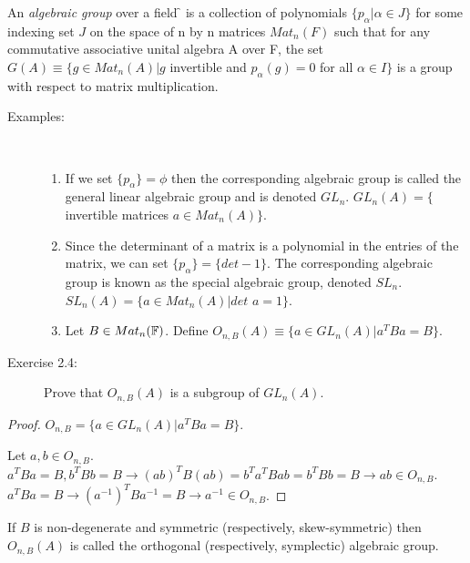 \documentclass[aps,onecolumn,secnumarabic,nobalancelastpage,amsmath,amssymb]{revtex4}
\begin{document}
An {\slshape algebraic group} over a field {\f} is a collection of polynomials $\{p_\alpha | \alpha \in J\}$ for some indexing set $J$ on the space of n by n matrices $Mat_n(F)$ such that for any commutative associative unital algebra A over F, the set $G(A) \equiv \{ g \in Mat_n(A) | g$ invertible and $p_\alpha(g) = 0$ for all $\alpha \in I \}$ is a group with respect to matrix multiplication. 

\begin{description}
\item[Examples:]\ 

\begin{enumerate}
\item If we set $\{p_\alpha\} = \phi$ then the corresponding algebraic group is called the general linear algebraic group and is denoted $GL_n$. $GL_n(A) = \{$ invertible matrices $a \in Mat_n(A) \}$.
\item Since the determinant of a matrix is a polynomial in the entries of the matrix, we can set $\{p_\alpha\} = \{det - 1\}$. The corresponding algebraic group is known as the special algebraic group, denoted $SL_n$. $SL_n(A) = \{ a \in Mat_n(A) | det$ $a = 1\}$.
\item Let $B \in Mat_n(\mathbb{F})$. Define $O_{n,B}(A) \equiv \{ a \in GL_n(A) | a^T B a = B\}$. 
\end{enumerate}

\item[Exercise 2.4:] Prove that $O_{n,B}(A)$ is a subgroup of $GL_n(A)$. 
\end{description}
\begin{proof}
$O_{n,B} = \{a \in GL_n(A) | a^T B a = B\}$.

Let $a,b \in O_{n,B}$.  $a^T B a = B, b^T B b = B \rightarrow (a b)^T B (a b) = b^T a^T B a b = b^T B b = B \rightarrow a b \in O_{n,B}$.  $a^T B a = B \rightarrow (a^{-1})^T B a^{-1} = B \rightarrow a^{-1} \in O_{n,B}$. 
\end{proof}

If $B$ is non-degenerate and symmetric (respectively, skew-symmetric) then $O_{n,B}(A)$ is called the orthogonal (respectively, symplectic) algebraic group. 
\end{document}
